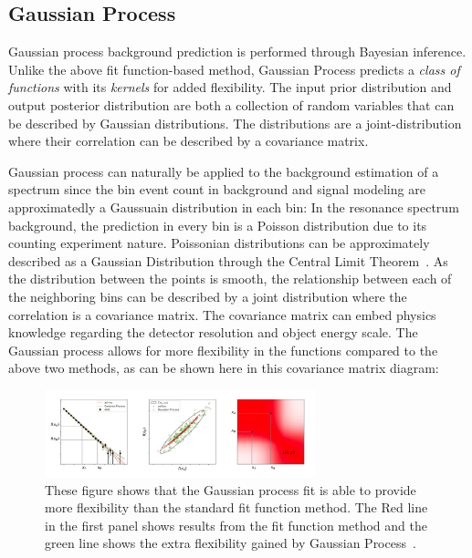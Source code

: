    \subsection{Gaussian Process} 
    \label{sec:GP}

    Gaussian process background prediction is performed through Bayesian inference. Unlike the above fit function-based method, Gaussian Process predicts a \textit{class of functions} with its \textit{kernels} for added flexibility. The input prior distribution and output posterior distribution are both a collection of random variables that can be described by Gaussian distributions. The distributions are a joint-distribution where their correlation can be described by a covariance
    matrix.

    Gaussian process can naturally be applied to the background estimation of a spectrum since the bin event count in background and signal modeling are approximatedly a Gaussuain distribution in each bin: In the resonance spectrum background, the prediction in every bin is a Poisson distribution due to its counting experiment nature. Poissonian distributions can be approximately described as a Gaussian Distribution through the Central Limit Theorem~\cite{kwak2017central}. As the distribution between the points is smooth, the relationship between each of the neighboring bins can be described by a joint distribution where the correlation is a covariance matrix. The covariance matrix can embed physics knowledge regarding the detector resolution and object energy scale. The Gaussian process allows for more flexibility in the functions compared to the above two methods, as can be shown here in this covariance matrix diagram:

    \begin{figure}[!htb]
        \begin{center}
            \includegraphics[width=0.7\textwidth]{figures/chapter_analysismethod/GP}
            \caption{
                These figure shows that the Gaussian process fit is able to provide more flexibility than the standard fit function method. The Red line in the first panel shows results from the fit function method and the green line shows the extra flexibility gained by Gaussian Process~\cite{frate2017modeling}.
            }
            \label{fig:GaussianProcess}
        \end{center}
    \end{figure}
    \FloatBarrier


